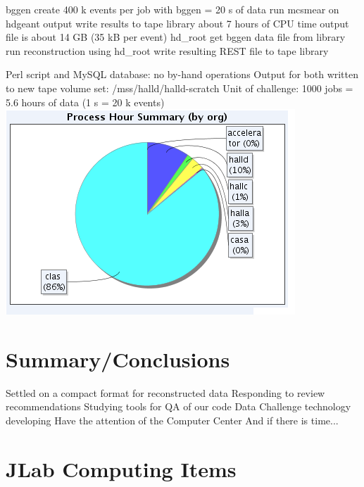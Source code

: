 
\I bggen
        \I create 400 k events per job with bggen = 20 s of data
        \I run mcsmear on hdgeant output
        \I write results to tape library
        \I about 7 hours of CPU time
        \I output file is about 14 GB (35 kB per event) 
\I hd\_root
        \I get bggen data file from library
        \I run reconstruction using hd_root
        \I write resulting REST file to tape library

\I Perl script and MySQL database: no by-hand operations
\I Output for both written to new tape volume set: /mss/halld/halld-scratch
\I Unit of challenge: 1000 jobs = 5.6 hours of data (1 s = 20 k events)
\includegraphics{Farm_usage_2012-09-10.png}

\section{Summary/Conclusions}


\I Settled on a compact format for reconstructed data
\I Responding to review recommendations
\I Studying tools for QA of our code
\I Data Challenge technology developing
\I Have the attention of the Computer Center
\I And if there is time...

\section{JLab Computing Items}


